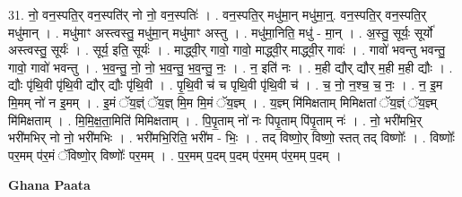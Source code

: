 \documentclass[17pt]{extarticle}
\begin{document}
31. नो॒ वन॒स्पति॒र् वन॒स्पति॑र् नो नो॒ वन॒स्पतिः॑ । . वन॒स्पति॒र् मधु॑मा॒न् मधु॑मा॒न्॒. वन॒स्पति॒र् वन॒स्पति॒र् मधु॑मान् । . मधु॑माꣳ अस्त्वस्तु॒ मधु॑मा॒न् मधु॑माꣳ अस्तु । . मधु॑मा॒निति॒ मधु॑ - मा॒न् । . अ॒स्तु॒ सूर्यः॒ सूर्यो॑ अस्त्वस्तु॒ सूर्यः॑ । . सूर्य॒ इति॒ सूर्यः॑ । . माद्ध्वी॒र् गावो॒ गावो॒ माद्ध्वी॒र् माद्ध्वी॒र् गावः॑ । . गावो॑ भवन्तु भवन्तु॒ गावो॒ गावो॑ भवन्तु । . भ॒व॒न्तु॒ नो॒ नो॒ भ॒व॒न्तु॒ भ॒व॒न्तु॒ नः॒ । . न॒ इति॑ नः । . म॒ही द्यौर् द्यौर् म॒ही म॒ही द्यौः । . द्यौः पृ॑थि॒वी पृ॑थि॒वी द्यौर् द्यौः पृ॑थि॒वी । . पृ॒थि॒वी च॑ च पृथि॒वी पृ॑थि॒वी च॑ । . च॒ नो॒ न॒श्च॒ च॒ नः॒ । . न॒ इ॒म मि॒मम् नो॑ न इ॒मम् । . इ॒मं ॅय॒ज्ञ्ं ॅय॒ज्ञ् मि॒म मि॒मं ॅय॒ज्ञ्म् । . य॒ज्ञ्म् मि॑मिक्षताम् मिमिक्षतां ॅय॒ज्ञ्ं ॅय॒ज्ञ्म् मि॑मिक्षताम् । . मि॒मि॒क्ष॒ता॒मिति॑ मिमिक्षताम् । . पि॒पृ॒ताम् नो॑ नः पिपृ॒ताम् पि॑पृ॒ताम् नः॑ । . नो॒ भरी॑मभि॒र् भरी॑मभिर् नो नो॒ भरी॑मभिः । . भरी॑मभि॒रिति॒ भरी॑म - भिः॒ । . तद् विष्णो॒र् विष्णो॒ स्तत् तद् विष्णोः᳚ । . विष्णोः᳚ पर॒मम् प॑र॒मं ॅविष्णो॒र् विष्णोः᳚ पर॒मम् । . प॒र॒मम् प॒दम् प॒दम् प॑र॒मम् प॑र॒मम् प॒दम् । \newline

\textbf{Ghana Paata } \newline
\end{document}
